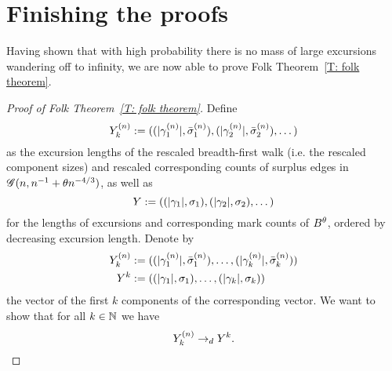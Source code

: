 \section{Finishing the proofs} \label{S: proofs}
Having shown that with high probability there is no mass of large excursions wandering off to infinity,
we are now able to prove Folk Theorem~\ref{T: folk theorem}.

\begin{proof}[Proof of Folk Theorem~\ref{T: folk theorem}]
	Define
	\begin{equation} \label{E: def Yn}
		{Y}^{(n)}_k := ((|\gamma^{(n)}_1|, \bar{\sigma}^{(n)}_1), (|\gamma^{(n)}_2|, \bar{\sigma}^{(n)}_2), \dots)
	\end{equation}
	as the excursion lengths of the rescaled breadth-first walk (i.e. the rescaled component sizes) 
	and rescaled corresponding counts of surplus edges in $\mathscr{G}(n, n^{-1} + \theta n^{-4/3})$,
	as well as
	\begin{equation} \label{E: def Y}
		{Y} := ((|\gamma_1|, \sigma_1), (|\gamma_2|, \sigma_2), \dots)
	\end{equation}
	for the lengths of excursions and corresponding mark counts of $B^{\theta}$, ordered by decreasing excursion length.
	Denote by 
	\begin{equation}
		\begin{aligned}
		{Y}^{(n)}_k &:= ((|\gamma^{(n)}_1|, \bar{\sigma}^{(n)}_1), \dots, (|\gamma^{(n)}_k|, \bar{\sigma}^{(n)}_k)) \\
		{Y}^k  &:= ((|\gamma_1|, \sigma_1), \dots, (|\gamma_k|, \sigma_k))
		\end{aligned}
	\end{equation}
	the vector of the first $k$ components of the corresponding vector.
	We want to show that for all $k \in \mathbb{N}$ we have
	\begin{equation}
		{Y}^{(n)}_k \rightarrow_d {Y}^k.
	\end{equation}
	

\end{proof}
